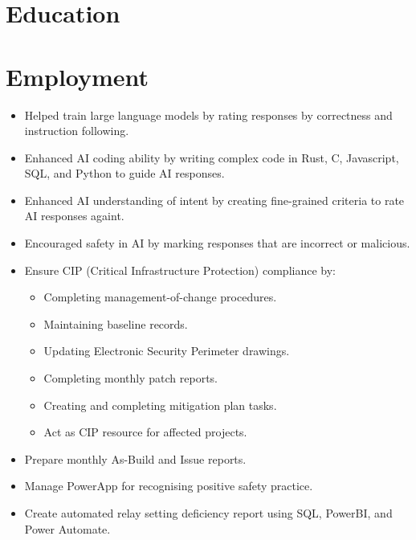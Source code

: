 \documentclass{lsanche_cv}
\begin{document}

\medskip


\smallskip


\section{Education}

\section{Employment}
\begin{itemize}
		\item Helped train large language models by rating responses by correctness and instruction following.
		\item Enhanced AI coding ability by writing complex code in Rust, C, Javascript, SQL, and Python to guide AI responses.
		\item Enhanced AI understanding of intent by creating fine-grained criteria to rate AI responses againt.
		\item Encouraged safety in AI by marking responses that are incorrect or malicious.
\end{itemize}

\divider

\begin{itemize}
		\item Ensure CIP (Critical Infrastructure Protection) compliance by:
    \begin{itemize}
      \item Completing management-of-change procedures.
      \item Maintaining baseline records.
      \item Updating Electronic Security Perimeter drawings.
      \item Completing monthly patch reports.
      \item Creating and completing mitigation plan tasks.
      \item Act as CIP resource for affected projects.
    \end{itemize}
		\item Prepare monthly As-Build and Issue reports.
		\item Manage PowerApp for recognising positive safety practice.
		\item Create automated relay setting deficiency report using SQL, PowerBI, and Power Automate.
\end{itemize}
\end{document}
